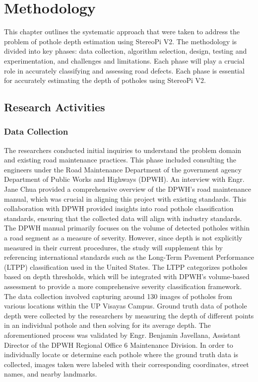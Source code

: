 \chapter{Methodology}
This chapter outlines the systematic approach that were taken to address the problem of pothole depth estimation using StereoPi V2. The methodology is divided into key phases: data collection, algorithm selection, design, testing and experimentation, and challenges and limitations. Each phase will play a crucial role in accurately classifying and assessing road defects.  Each phase is essential for accurately estimating the depth of potholes using StereoPi V2. 

\section{ Research Activities}

\subsection{Data Collection}
The researchers conducted initial inquiries to understand the problem domain and existing road maintenance practices. This phase included consulting the engineers under the Road Maintenance Department of the government agency Department of Public Works and Highways (DPWH). An interview with Engr. Jane Chua provided a comprehensive overview of the DPWH's road maintenance manual, which was crucial in aligning this project with existing standards. This collaboration with DPWH provided insights into road pothole classification standards, ensuring that the collected data will align with industry standards. The DPWH manual primarily focuses on the volume of detected potholes within a road segment as a measure of severity. However, since depth is not explicitly measured in their current procedures, the study will supplement this by referencing international standards such as the Long-Term Pavement Performance (LTPP) classification used in the United States. The LTPP categorizes potholes based on depth thresholds, which will be integrated with DPWH’s volume-based assessment to provide a more comprehensive severity classification framework. The data collection involved capturing around 130 images of potholes from various locations within the UP Visayas Campus. Ground truth data of pothole depth were collected by the researchers by measuring the depth of different points in an individual pothole and then solving for its average depth. The aforementioned process was validated by Engr. Benjamin Javellana, Assistant Director of the DPWH Regional Office 6 Maintenance Division. In order to individually locate or determine each pothole where the ground truth data is collected, images taken were labeled with their corresponding coordinates, street names, and nearby landmarks.

